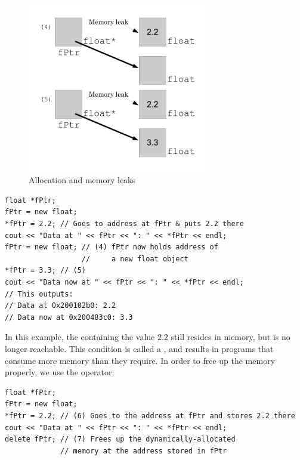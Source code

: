 \begin{figure}[tbh]
  \centering
  \includegraphics[width=0.7\textwidth]{diagrams/new_operator_diagram_2.pdf}
  \caption{Allocation and memory leaks} \label{fig:new_operator_diagram_2} 
\end{figure}

\noindent\begin{minipage}{\linewidth}\begin{lstlisting}
float *fPtr;
fPtr = new float;
*fPtr = 2.2; // Goes to address at fPtr & puts 2.2 there
cout << "Data at " << fPtr << ": " << *fPtr << endl;
fPtr = new float; // (4) fPtr now holds address of 
                  //     a new float object
*fPtr = 3.3; // (5)
cout << "Data now at " << fPtr << ": " << *fPtr << endl;
// This outputs: 
// Data at 0x200102b0: 2.2
// Data now at 0x200483c0: 3.3
\end{lstlisting}\end{minipage}

In this example, the  containing the value $2.2$ still resides in memory, but is no longer reachable. 
This condition is called a , and results in programs that consume more memory than they require. 
In order to free up the memory properly, we use the  operator: \nopagebreak[4]

\noindent\begin{minipage}{\linewidth}\begin{lstlisting}
float *fPtr;
fPtr = new float;
*fPtr = 2.2; // (6) Goes to the address at fPtr and stores 2.2 there
cout << "Data at " << fPtr << ": " << *fPtr << endl;
delete fPtr; // (7) Frees up the dynamically-allocated
             // memory at the address stored in fPtr
\end{lstlisting}\end{minipage}

